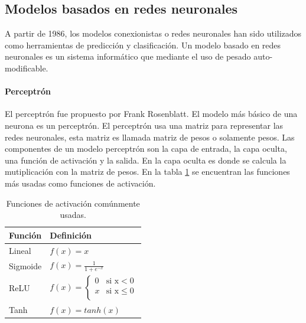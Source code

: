 \subsection{Modelos basados en redes neuronales}

A partir de 1986\cite{Rumelhart_1987}, los modelos conexionistas o redes neuronales han sido utilizados como herramientas de predicción y clasificación. Un modelo basado en redes neuronales es un sistema informático que mediante el uso de pesado auto-modificable.

\paragraph{Perceptrón}

El perceptrón fue propuesto por Frank Rosenblatt\cite{Rosenblatt_1958}. El modelo más básico de una neurona es un perceptrón. El perceptrón usa una matriz para representar las redes neuronales, esta matriz es llamada matriz de pesos o solamente pesos. Las componentes de un modelo perceptrón son la capa de entrada, la capa oculta, una función de activación y la salida. En la capa oculta es donde se calcula la mutiplicación con la matriz de pesos. En la tabla \ref{table:activation_functions} se encuentran las funciones más usadas como funciones de activación.

\begin{table}[H]
	\centering
	\begin{tabular}{ll} \hline
		\textbf{Función} & \textbf{Definición}         \\ \hline
		Lineal           & $f(x)=x$                    \\[0.1cm]
		Sigmoide         & $f(x)=\frac{1}{1+e^{-x}}$   \\[0.1cm]
		ReLU             & $f(x)=\begin{cases}
				                         0 & \text{si x}<0     \\
				                         x & \text{si x}\leq 0 \\
			                         \end{cases}$ \\ [0.1cm]
		Tanh             & $f(x)=tanh(x)$              \\ [0.1cm] \hline
	\end{tabular}
	\caption{Funciones de activación comúnmente usadas.}
	\label{table:activation_functions}
\end{table}

